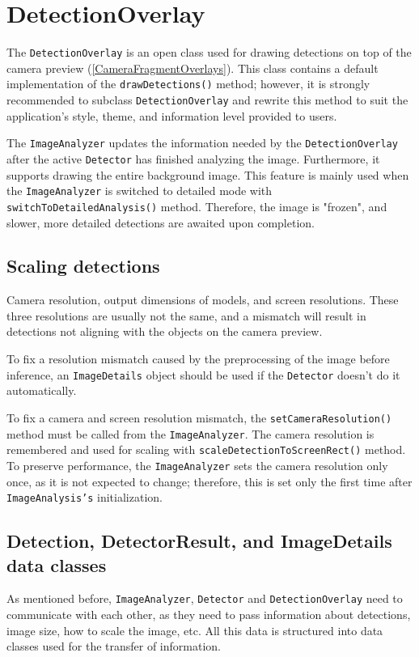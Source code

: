 
\section{DetectionOverlay}
\label{DetectionOverlay}

The \texttt{DetectionOverlay} is an open class used for drawing detections on top of the camera preview (\ref{CameraFragmentOverlays}). This class contains a default implementation of the \texttt{drawDetections()} method; however, it is strongly recommended to subclass \texttt{DetectionOverlay} and rewrite this method to suit the application's style, theme, and information level provided to users. 

The \texttt{ImageAnalyzer} updates the information needed by the \texttt{DetectionOverlay} after the active \texttt{Detector} has finished analyzing the image. Furthermore, it supports drawing the entire background image. This feature is mainly used when the \texttt{ImageAnalyzer} is switched to detailed mode with \texttt{switchToDetailedAnalysis()} method. Therefore, the image is "frozen", and slower, more detailed detections are awaited upon completion.

\subsection{Scaling detections}
Camera resolution, output dimensions of models, and screen resolutions. These three resolutions are usually not the same, and a mismatch will result in detections not aligning with the objects on the camera preview. 

To fix a resolution mismatch caused by the preprocessing of the image before inference, an \texttt{ImageDetails} object should be used if the \texttt{Detector} doesn't do it automatically.

To fix a camera and screen resolution mismatch, the \texttt{setCameraResolution()} method must be called from the \texttt{ImageAnalyzer}. The camera resolution is remembered and used for scaling with \texttt{scaleDetectionToScreenRect()} method. To preserve performance, the \texttt{ImageAnalyzer} sets the camera resolution only once, as it is not expected to change; therefore, this is set only the first time after \texttt{ImageAnalysis's} initialization.

\subsection{Detection, DetectorResult, and ImageDetails data classes}
\label{DataClasses}
As mentioned before, \texttt{ImageAnalyzer}, \texttt{Detector} and \texttt{DetectionOverlay} need to communicate with each other, as they need to pass information about detections, image size, how to scale the image, etc. All this data is structured into data classes used for the transfer of information.

